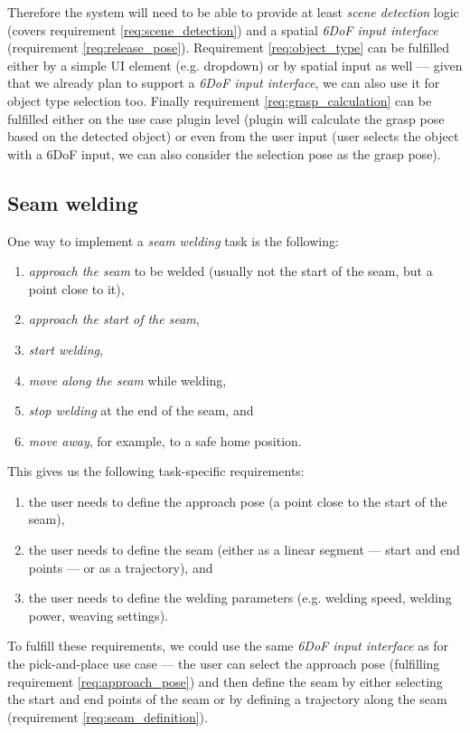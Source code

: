 Therefore the system will need to be able to provide at least \emph{scene detection} logic (covers requirement \ref{req:scene_detection}) and a spatial \emph{6DoF input interface} (requirement \ref{req:release_pose}). Requirement \ref{req:object_type} can be fulfilled either by a simple UI element (e.g. dropdown) or by spatial input as well --- given that we already plan to support a \emph{6DoF input interface}, we can also use it for object type selection too. Finally requirement \ref{req:grasp_calculation} can be fulfilled either on the use case plugin level (plugin will calculate the grasp pose based on the detected object) or even from the user input (user selects the object with a 6DoF input, we can also consider the selection pose as the grasp pose).

\subsection{Seam welding} \label{subsec:ch2_analysis_seam_welding}

One way to implement a \emph{seam welding} task is the following:
\begin{enumerate}[label=(\arabic*), itemsep=0.2em]
    \item \emph{approach the seam} to be welded (usually not the start of the seam, but a point close to it),
    \item \emph{approach the start of the seam},
    \item \emph{start welding},
    \item \emph{move along the seam} while welding,
    \item \emph{stop welding} at the end of the seam, and
    \item \emph{move away}, for example, to a safe home position.
\end{enumerate}

This gives us the following task-specific requirements:
\begin{enumerate}[label=(\roman*), itemsep=0.2em]
    \item the user needs to define the approach pose (a point close to the start of the seam), \label{req:approach_pose}
    \item the user needs to define the seam (either as a linear segment --- start and end points --- or as a trajectory), and \label{req:seam_definition}
    \item the user needs to define the welding parameters (e.g. welding speed, welding power, weaving settings). \label{req:welding_parameters}
\end{enumerate}
To fulfill these requirements, we could use the same \emph{6DoF input interface} as for the pick-and-place use case --- the user can select the approach pose (fulfilling requirement \ref{req:approach_pose}) and then define the seam by either selecting the start and end points of the seam or by defining a trajectory along the seam (requirement \ref{req:seam_definition}).


